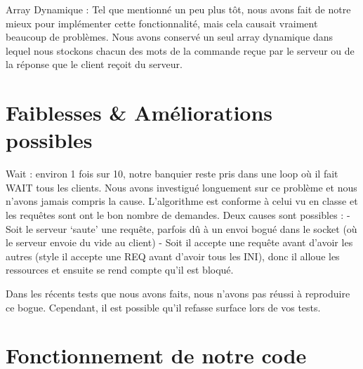 \documentclass[11pt]{article}
\begin{document}
Array Dynamique : Tel que mentionné un peu plus tôt, nous avons fait de notre mieux pour implémenter cette fonctionnalité, mais cela causait vraiment beaucoup de problèmes. Nous avons conservé un seul array dynamique dans lequel nous stockons chacun des mots de la commande reçue par le serveur ou de la réponse que le client reçoit du serveur.
 
\section{Faiblesses \& Améliorations possibles}
Wait : environ 1 fois sur 10, notre banquier reste pris dans une loop où il fait WAIT tous les clients. Nous avons investigué longuement sur ce problème et nous n’avons jamais compris la cause. L’algorithme est conforme à celui vu en classe et les requêtes sont ont le bon nombre de demandes. Deux causes sont possibles :
- Soit le serveur ‘saute’ une requête, parfois dû à un envoi bogué dans le socket (où le serveur envoie du vide au client)
- Soit il accepte une requête avant d’avoir les autres (style il accepte une REQ avant d’avoir tous les INI), donc il alloue les ressources et ensuite se rend compte qu’il est bloqué.

Dans les récents tests que nous avons faits, nous n’avons pas réussi à reproduire ce bogue. Cependant, il est possible qu’il refasse surface lors de vos tests.


\section{Fonctionnement de notre code}
\end{document}
